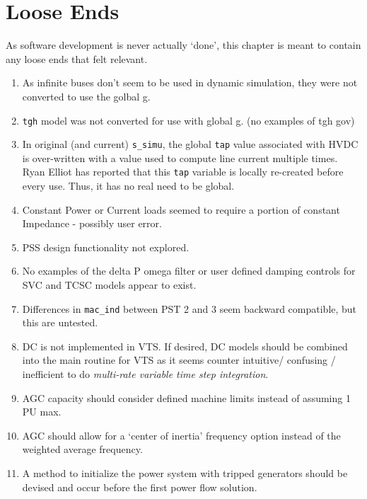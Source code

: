 \chapter{Loose Ends}
As software development is never actually `done', this chapter is meant to contain any loose ends that felt relevant.

\begin{enumerate}
\singlespacing
{} em
	\item As infinite buses don't seem to be used in dynamic simulation, they were not converted to use the golbal g.
	\item \verb|tgh| model was not converted for use with global g. (no examples of tgh gov)
	\item In original (and current) \verb|s_simu|, the global \verb|tap| value associated with HVDC is over-written with  a value used to compute line current multiple times. \\Ryan Elliot has reported that this \verb|tap| variable is locally re-created before every use. Thus, it has no real need to be global.
	\item Constant Power or Current loads seemed to require a portion of constant Impedance - possibly user error.
	\item PSS design functionality not explored.
	\item No examples of the delta P omega filter or user defined damping controls for SVC and TCSC models appear to exist.
	\item Differences in \verb|mac_ind| between PST 2 and 3 seem backward compatible, but this are untested.
	\item DC is not implemented in VTS. If desired, DC models should be combined into the main routine for VTS as it seems counter intuitive/ confusing / inefficient to do \emph{multi-rate variable time step integration}.
	\item AGC capacity should consider defined machine limits instead of assuming 1 PU max.
	\item AGC should allow for a `center of inertia' frequency option instead of the weighted average frequency.
	\item A method to initialize the power system with tripped generators should be devised and occur before the first power flow solution.

\end{enumerate}
